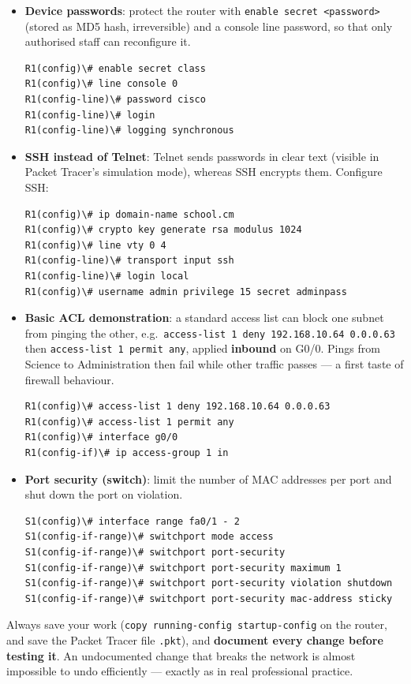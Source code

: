 \documentclass[11pt]{article}
\begin{document}
\begin{itemize}
\item \textbf{Device passwords}: protect the router with \texttt{enable secret <password>} (stored as MD5 hash, irreversible) and a console line password, so that only authorised staff can reconfigure it.
\begin{verbatim}
R1(config)\# enable secret class
R1(config)\# line console 0
R1(config-line)\# password cisco
R1(config-line)\# login
R1(config-line)\# logging synchronous
\end{verbatim}
\item \textbf{SSH instead of Telnet}: Telnet sends passwords in clear text (visible in Packet Tracer's simulation mode), whereas SSH encrypts them. Configure SSH:
\begin{verbatim}
R1(config)\# ip domain-name school.cm
R1(config)\# crypto key generate rsa modulus 1024
R1(config)\# line vty 0 4
R1(config-line)\# transport input ssh
R1(config-line)\# login local
R1(config)\# username admin privilege 15 secret adminpass
\end{verbatim}
\item \textbf{Basic ACL demonstration}: a standard access list can block one subnet from pinging the other, e.g.\ \texttt{access-list 1 deny 192.168.10.64 0.0.0.63} then \texttt{access-list 1 permit any}, applied \textbf{inbound} on G0/0. Pings from Science to Administration then fail while other traffic passes --- a first taste of firewall behaviour.
\begin{verbatim}
R1(config)\# access-list 1 deny 192.168.10.64 0.0.0.63
R1(config)\# access-list 1 permit any
R1(config)\# interface g0/0
R1(config-if)\# ip access-group 1 in
\end{verbatim}
\item \textbf{Port security (switch)}: limit the number of MAC addresses per port and shut down the port on violation.
\begin{verbatim}
S1(config)\# interface range fa0/1 - 2
S1(config-if-range)\# switchport mode access
S1(config-if-range)\# switchport port-security
S1(config-if-range)\# switchport port-security maximum 1
S1(config-if-range)\# switchport port-security violation shutdown
S1(config-if-range)\# switchport port-security mac-address sticky
\end{verbatim}
\end{itemize}

\begin{attention}
Always save your work (\texttt{copy running-config startup-config} on the router, and save the Packet Tracer file \texttt{.pkt}), and \textbf{document every change before testing it}. An undocumented change that breaks the network is almost impossible to undo efficiently --- exactly as in real professional practice.
\end{attention}
\end{document}
